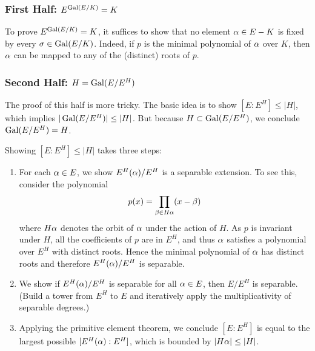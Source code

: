 \subsubsection{First Half: $E^{\operatorname{Gal}(E/K)} = K$}
To prove $E^{\operatorname{Gal}(E/K)} = K$, it suffices to show that no element $\alpha \in E-K$ is fixed by every $\sigma \in \operatorname{Gal}(E/K)$. Indeed, if $p$ is the minimal polynomial of $\alpha$ over $K$, then $\alpha$ can be mapped to any of the (distinct) roots of $p$.

\subsubsection{Second Half: $H = \operatorname{Gal}(E/E^H)$}
The proof of this half is more tricky. The basic idea is to show $[E : E^H] \leq |H|$, which implies $|\operatorname{Gal}(E/E^H)| \leq |H|$. But because $H \subset \operatorname{Gal}(E/E^H)$, we conclude $\operatorname{Gal}(E/E^H) = H$.

Showing $[E : E^H] \leq |H|$ takes three steps:
\begin{enumerate}
    \item For each $\alpha \in E$, we show $E^H(\alpha)/E^H$ is a separable extension. To see this, consider the polynomial
        \[
            p(x) = \prod_{\beta \in H\alpha} (x - \beta)
        \]
        where $H\alpha$ denotes the orbit of $\alpha$ under the action of $H$. As $p$ is invariant under $H$, all the coefficients of $p$ are in $E^H$, and thus $\alpha$ satisfies a polynomial over $E^H$ with distinct roots. Hence the minimal polynomial of $\alpha$ has distinct roots and therefore $E^H(\alpha)/E^H$ is separable.
    \item We show if $E^H(\alpha)/E^H$ is separable for all $\alpha \in E$, then $E/E^H$ is separable. (Build a tower from $E^H$ to $E$ and iteratively apply the multiplicativity of separable degrees.)
    \item Applying the primitive element theorem, we conclude $[E : E^H]$ is equal to the largest possible $[E^H(\alpha): E^H]$, which is bounded by $|H\alpha| \leq |H|$.
\end{enumerate}


